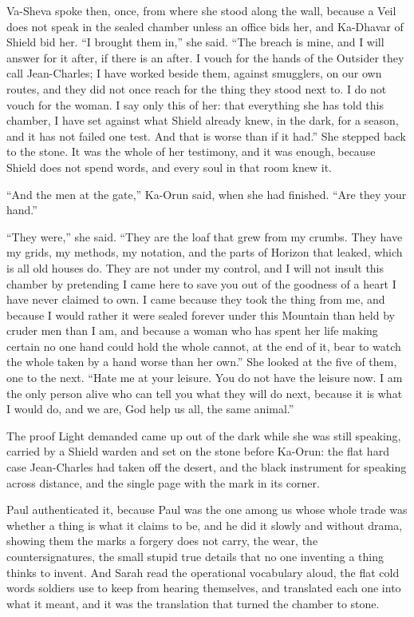 Va-Sheva spoke then, once, from where she stood along the wall, because a Veil does not speak in the sealed chamber unless an office bids her, and Ka-Dhavar of Shield bid her. ``I brought them in,'' she said. ``The breach is mine, and I will answer for it after, if there is an after. I vouch for the hands of the Outsider they call Jean-Charles; I have worked beside them, against smugglers, on our own routes, and they did not once reach for the thing they stood next to. I do not vouch for the woman. I say only this of her: that everything she has told this chamber, I have set against what Shield already knew, in the dark, for a season, and it has not failed one test. And that is worse than if it had.'' She stepped back to the stone. It was the whole of her testimony, and it was enough, because Shield does not spend words, and every soul in that room knew it.\par

``And the men at the gate,'' Ka-Orun said, when she had finished. ``Are they your hand.''\par

``They were,'' she said. ``They are the loaf that grew from my crumbs. They have my grids, my methods, my notation, and the parts of Horizon that leaked, which is all old houses do. They are not under my control, and I will not insult this chamber by pretending I came here to save you out of the goodness of a heart I have never claimed to own. I came because they took the thing from me, and because I would rather it were sealed forever under this Mountain than held by cruder men than I am, and because a woman who has spent her life making certain no one hand could hold the whole cannot, at the end of it, bear to watch the whole taken by a hand worse than her own.'' She looked at the five of them, one to the next. ``Hate me at your leisure. You do not have the leisure now. I am the only person alive who can tell you what they will do next, because it is what I would do, and we are, God help us all, the same animal.''\par

\ornament

The proof Light demanded came up out of the dark while she was still speaking, carried by a Shield warden and set on the stone before Ka-Orun: the flat hard case Jean-Charles had taken off the desert, and the black instrument for speaking across distance, and the single page with the mark in its corner.\par

Paul authenticated it, because Paul was the one among us whose whole trade was whether a thing is what it claims to be, and he did it slowly and without drama, showing them the marks a forgery does not carry, the wear, the countersignatures, the small stupid true details that no one inventing a thing thinks to invent. And Sarah read the operational vocabulary aloud, the flat cold words soldiers use to keep from hearing themselves, and translated each one into what it meant, and it was the translation that turned the chamber to stone.\par

